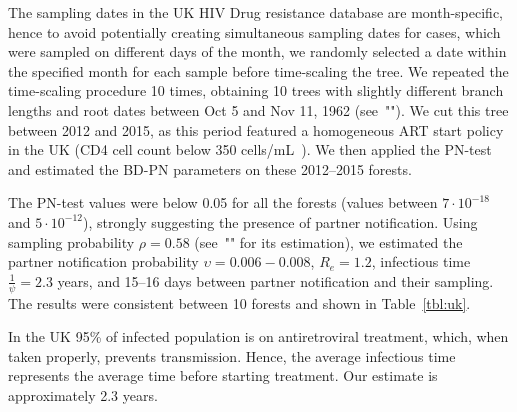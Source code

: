 \documentclass[10pt,letterpaper]{article}
\begin{document}
The sampling dates in the UK HIV Drug resistance database are month-specific, hence to avoid potentially creating simultaneous sampling dates for cases, which were sampled on different days of the month, we randomly selected a date within the specified month for each sample before time-scaling the tree. We repeated the time-scaling procedure 10 times, obtaining 10 trees with slightly different branch lengths and root dates between Oct 5 and Nov 11, 1962 (see~""). We cut this tree between 2012 and 2015, as this period featured a homogeneous ART start policy in the UK (CD4 cell count below 350 cells/mL~\cite{williamsBritishHIVAssociation2012}). We then applied the PN-test and estimated the BD-PN parameters on these 2012--2015 forests. 

The PN-test values were below 0.05 for all the forests (values between $7 \cdot 10^{-18}$ and $5 \cdot 10^{-12}$), strongly suggesting the presence of partner notification. Using sampling probability $\rho=0.58$ (see~"" for its estimation), we estimated the partner notification probability $\upsilon=0.006-0.008$, %
$R_e = 1.2$, infectious time $\frac{1}{\psi} = 2.3$ years, and 15--16 days between partner notification and their sampling. The results were consistent between 10 forests and shown in Table~\ref{tbl:uk}. %
 
In the UK 95\% of infected population is on antiretroviral treatment, which, when taken properly, prevents transmission. Hence, the average infectious time represents the average time before starting treatment. Our estimate is approximately 2.3 years. 
\end{document}
